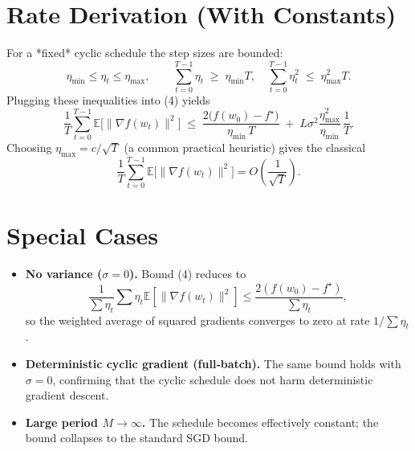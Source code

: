 \documentclass{article}
\newcommand{\EE}{\mathbb{E}}
\begin{document}
\section*{Rate Derivation (With Constants)}
For a *fixed* cyclic schedule the step sizes are bounded:
\[
\eta_{\min}\le\eta_t\le\eta_{\max},\qquad
\sum_{t=0}^{T-1}\eta_t\;\ge\; \eta_{\min}T,
\quad
\sum_{t=0}^{T-1}\eta_t^{2}\;\le\; \eta_{\max}^{2}T .
\]
Plugging these inequalities into (4) yields
\[
\frac{1}{T}\sum_{t=0}^{T-1}\EE\!\bigl[\|\nabla f(w_t)\|^{2}\bigr]
\;\le\;
\frac{2\bigl(f(w_0)-f^\star\bigr)}{\eta_{\min}\,T}
\;+\;
L\sigma^{2}\frac{\eta_{\max}^{2}}{\eta_{\min}}\,\frac{1}{T}.
\]
Choosing $\eta_{\max}=c/\sqrt{T}$ (a common practical heuristic) gives the classical
\[
\frac{1}{T}\sum_{t=0}^{T-1}\EE\!\bigl[\|\nabla f(w_t)\|^{2}\bigr]
=O\!\left(\frac{1}{\sqrt{T}}\right).
\]

\section*{Special Cases}
\begin{itemize}
\item \textbf{No variance ($\sigma=0$).} Bound (4) reduces to
\[
\frac{1}{\sum\eta_t}\sum\eta_t\EE[\|\nabla f(w_t)\|^{2}]
\le\frac{2(f(w_0)-f^\star)}{\sum\eta_t},
\]
so the weighted average of squared gradients converges to zero at rate $1/\sum\eta_t$.
\item \textbf{Deterministic cyclic gradient (full‑batch).} The same bound holds with $\sigma=0$, confirming that the cyclic schedule does not harm deterministic gradient descent.
\item \textbf{Large period $M\to\infty$.} The schedule becomes effectively constant; the bound collapses to the standard SGD bound.
\end{itemize}
\end{document}
